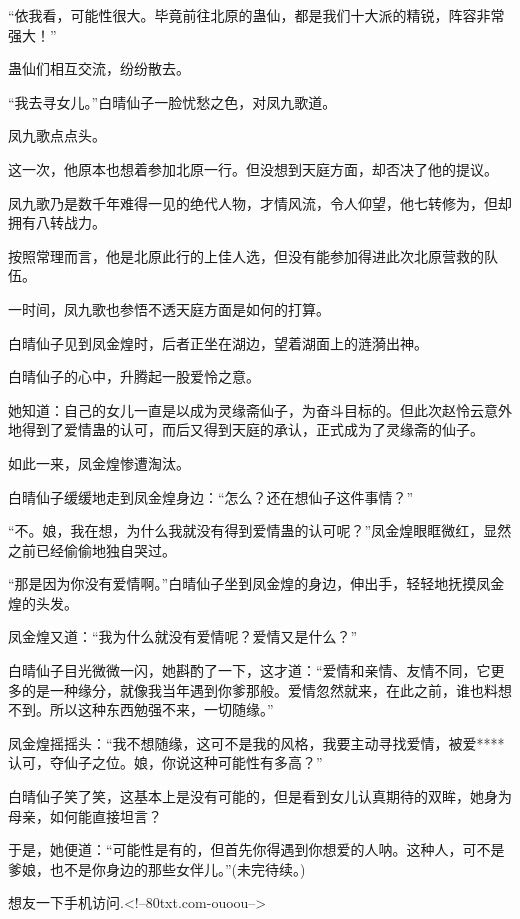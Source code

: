 \begin{this_body}
“依我看，可能性很大。毕竟前往北原的蛊仙，都是我们十大派的精锐，阵容非常强大！”

蛊仙们相互交流，纷纷散去。

“我去寻女儿。”白晴仙子一脸忧愁之色，对凤九歌道。

凤九歌点点头。

这一次，他原本也想着参加北原一行。但没想到天庭方面，却否决了他的提议。

凤九歌乃是数千年难得一见的绝代人物，才情风流，令人仰望，他七转修为，但却拥有八转战力。

按照常理而言，他是北原此行的上佳人选，但没有能参加得进此次北原营救的队伍。

一时间，凤九歌也参悟不透天庭方面是如何的打算。

白晴仙子见到凤金煌时，后者正坐在湖边，望着湖面上的涟漪出神。

白晴仙子的心中，升腾起一股爱怜之意。

她知道：自己的女儿一直是以成为灵缘斋仙子，为奋斗目标的。但此次赵怜云意外地得到了爱情蛊的认可，而后又得到天庭的承认，正式成为了灵缘斋的仙子。

如此一来，凤金煌惨遭淘汰。

白晴仙子缓缓地走到凤金煌身边：“怎么？还在想仙子这件事情？”

“不。娘，我在想，为什么我就没有得到爱情蛊的认可呢？”凤金煌眼眶微红，显然之前已经偷偷地独自哭过。

“那是因为你没有爱情啊。”白晴仙子坐到凤金煌的身边，伸出手，轻轻地抚摸凤金煌的头发。

凤金煌又道：“我为什么就没有爱情呢？爱情又是什么？”

白晴仙子目光微微一闪，她斟酌了一下，这才道：“爱情和亲情、友情不同，它更多的是一种缘分，就像我当年遇到你爹那般。爱情忽然就来，在此之前，谁也料想不到。所以这种东西勉强不来，一切随缘。”

凤金煌摇摇头：“我不想随缘，这可不是我的风格，我要主动寻找爱情，被爱****认可，夺仙子之位。娘，你说这种可能性有多高？”

白晴仙子笑了笑，这基本上是没有可能的，但是看到女儿认真期待的双眸，她身为母亲，如何能直接坦言？

于是，她便道：“可能性是有的，但首先你得遇到你想爱的人呐。这种人，可不是爹娘，也不是你身边的那些女伴儿。”(未完待续。)

想友一下手机访问.<!--80txt.com-ouoou-->

\end{this_body}

